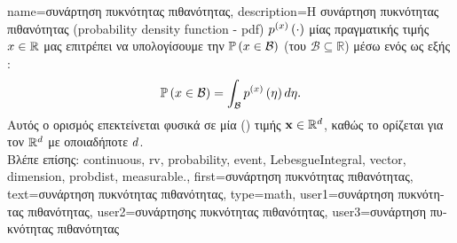 {name={\foreignlanguage{greek}{συνάρτηση πυκνότητας πιθανότητας}},
	description={\foreignlanguage{greek}{Η συνάρτηση πυκνότητας 
		πιθανότητας} (probability density function - pdf) 
		$p^{(x)}\left(\cdot\right)$ \foreignlanguage{greek}{μίας}   
		\foreignlanguage{greek}{πραγματικής τιμής $x \in \mathbb{R}$ μας επιτρέπει να υπολογίσουμε την} 
		 $\mathbb{P}\left(x \in \mathcal{B}\right)$ (\foreignlanguage{greek}{του}  
		$\mathcal{B} \subseteq \mathbb{R}$) \foreignlanguage{greek}{μέσω ενός}  \foreignlanguage{greek}{ως 
		εξής} \cite[\foreignlanguage{greek}{Κεφ.} 3]{BertsekasProb}:
	 	$$\mathbb{P}\left(x \in \mathcal{B}\right) = \int_{\mathcal{B}} p^{(x)}\left(\eta\right) d 
	 	\eta.$$  
		\foreignlanguage{greek}{Αυτός ο ορισμός επεκτείνεται φυσικά σε μία} ()  
		 \foreignlanguage{greek}{τιμής ${\bf x} \in \mathbb{R}^{d}$, καθώς το} 
		 \foreignlanguage{greek}{ορίζεται για τον $\mathbb{R}^{d}$ με οποιαδήποτε} 
		 $d$. 
		\\
        		\foreignlanguage{greek}{Βλέπε επίσης:} \gls{continuous}, \gls{rv}, \gls{probability}, \gls{event}, \gls{LebesgueIntegral}, \gls{vector}, 
		\gls{dimension}, \gls{probdist}, \gls{measurable}.},
	first={\foreignlanguage{greek}{συνάρτηση πυκνότητας πιθανότητας}},
	text={\foreignlanguage{greek}{συνάρτηση πυκνότητας πιθανότητας}},
	type=math,
	user1={\foreignlanguage{greek}{συνάρτηση πυκνότητας πιθανότητας}}, %
	user2={\foreignlanguage{greek}{συνάρτησης πυκνότητας πιθανότητας}}, %
	user3={\foreignlanguage{greek}{συνάρτηση πυκνότητας πιθανότητας}} %
}

